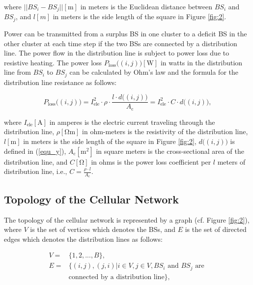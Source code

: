 \noindent
where $||BS_i-BS_j||[\mathrm{m}]$ in meters is the Euclidean distance between $BS_i$ and $BS_j$, and $l[m]$ in meters is the side length of the square in Figure \ref{fig:2}.

Power can be transmitted from a surplus BS in one cluster to a deficit BS in the other cluster at each time step if the two BSs are connected by a distribution line. The power flow in the distribution line is subject to power loss due to resistive heating. The power loss $P_{\mathrm{loss}}\big((i,j)\big)[\mathrm{W}]$ in watts in the distribution line from $BS_i$ to $BS_j$ can be calculated by Ohm's law and the formula for the distribution line resistance \cite{Resis} as follows:


\begin{equation}\label{loss}
P_{\mathrm{loss}}\big((i,j)\big)=I_{\mathrm{ele}}^2\cdot \rho\cdot  \frac{l \cdot d\big((i,j)\big)}{A_{\mathrm{c}}}=I_{\mathrm{ele}}^2\cdot C \cdot d\big((i,j)\big),
\end{equation}




\noindent
where $I_{\mathrm{ele}}[\mathrm{A}]$ in amperes is the electric current traveling through the distribution line, $\rho[\mathrm{\Omega m}]$ in ohm-meters is the resistivity of the distribution line, $l[\mathrm{m}]$ in meters is the side length of the square in Figure \ref{fig:2}, $d\big((i,j)\big)$ is defined in (\ref{equ_y}), $A_{\mathrm{c}}[\mathrm{m^2}]$ in square meters is the cross-sectional area of the distribution line, and $C[\mathrm{\Omega}]$ in ohms is the power loss coefficient
per $l$ meters of distribution line, i.e., $C=\frac{\rho\cdot l}{A_c}$.


\subsection{Topology of the Cellular Network}
The topology of the cellular network is represented by a graph (cf. Figure \ref{fig:2}), where $V$ is the set of vertices which denotes the BSs, and $E$ is the set of directed edges which denotes the distribution lines as follows:



\begin{equation}
\begin{aligned}\label{V_and_E}
V=&\{1,2,...,B\},\\
E=&\{(i,j),(j,i)|i\in V, j\in V, \text{$BS_i$ and $BS_j$ are } \\
& \text{connected by a distribution line}\},
\end{aligned}
\end{equation}



